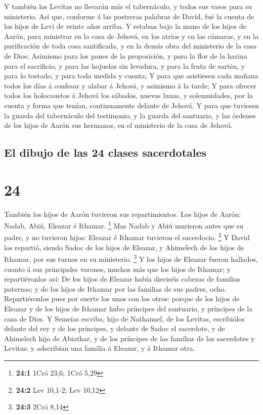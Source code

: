  Y también los Levitas no llevarán más el tabernáculo, y
todos sus vasos para su ministerio.  Así que, conforme á
las postreras palabras de David, fué la cuenta de los hijos de Leví de
veinte años arriba.  Y estaban bajo la mano de los hijos de
Aarón, para ministrar en la casa de Jehová, en los atrios y en las
cámaras, y en la purificación de toda cosa santificada, y en la demás
obra del ministerio de la casa de Dios;  Asimismo para los
panes de la proposición, y para la flor de la harina para el sacrificio,
y para las hojuelas sin levadura, y para la fruta de sartén, y para lo
tostado, y para toda medida y cuenta;  Y para que
asistiesen cada mañana todos los días á confesar y alabar á Jehová, y
asimismo á la tarde;  Y para ofrecer todos los holocaustos
á Jehová los sábados, nuevas lunas, y solemnidades, por la cuenta y
forma que tenían, continuamente delante de Jehová.  Y para
que tuviesen la guarda del tabernáculo del testimonio, y la guarda del
santuario, y las órdenes de los hijos de Aarón sus hermanos, en el
ministerio de la casa de Jehová.

\hypertarget{el-dibujo-de-las-24-clases-sacerdotales}{%
\subsection{El dibujo de las 24 clases
sacerdotales}\label{el-dibujo-de-las-24-clases-sacerdotales}}

\hypertarget{section-23}{%
\section{24}\label{section-23}}

 También los hijos de Aarón tuvieron sus repartimientos. Los
hijos de Aarón: Nadab, Abiú, Eleazar é Ithamar. \footnote{\textbf{24:1}
  1Cró 23,6; 1Cró 5,29}  Mas Nadab y Abiú murieron antes que
su padre, y no tuvieron hijos: Eleazar é Ithamar tuvieron el sacerdocio.
\footnote{\textbf{24:2} Lev 10,1-2; Lev 10,12}  Y David los
repartió, siendo Sadoc de los hijos de Eleazar, y Ahimelech de los hijos
de Ithamar, por sus turnos en su ministerio. \footnote{\textbf{24:3}
  2Cró 8,14}  Y los hijos de Eleazar fueron hallados, cuanto
á sus principales varones, muchos más que los hijos de Ithamar; y
repartiéronlos así: De los hijos de Eleazar había dieciséis cabezas de
familias paternas; y de los hijos de Ithamar por las familias de sus
padres, ocho.  Repartiéronlos pues por suerte los unos con
los otros: porque de los hijos de Eleazar y de los hijos de Ithamar hubo
príncipes del santuario, y príncipes de la casa de Dios.  Y
Semeías escriba, hijo de Nathanael, de los Levitas, escribiólos delante
del rey y de los príncipes, y delante de Sadoc el sacerdote, y de
Ahimelech hijo de Abiathar, y de los príncipes de las familias de los
sacerdotes y Levitas: y adscribían una familia á Eleazar, y á Ithamar
otra.

